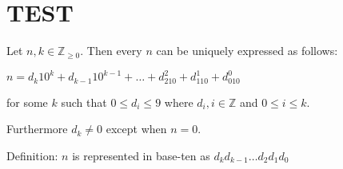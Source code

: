 \documentclass{article}
\newenvironment{jprIn}{\begin{adjustwidth}{2em}{}}{\end{adjustwidth}}
\begin{document}
\section*{TEST}

\begin{jprIn}
Let $n,k\in \mathbb{Z}_{\ge 0}$. Then every $n$ can be uniquely expressed as follows:

\hspace{3em}$n=d_k10^k+d_{k-1}10^{k-1}+\dots+d_210^2+d_110^1+d_010^0$

for some $k$ such that $0 \le d_i \le 9$ where $d_i,i\in\mathbb{Z}$ and $0 \le i \le k$.

Furthermore $d_k\ne0$ except when $n=0$.

Definition: $n$ is represented in base-ten as $d_kd_{k-1}\dots{}d_2d_1d_0$
\end{jprIn}
\bigskip
\end{document}
